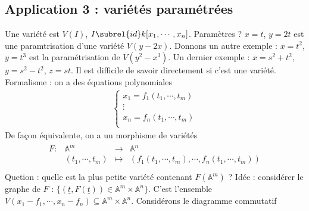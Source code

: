        \subsection{Application 3 : variétés paramétrées}
            Une variété est $V(I)$, $I \subrel{id} k[x_1, \cdots, x_n]$. Paramètres ? $x = t$, $y = 2t$ est une paramtrisation d'une variété $V(y - 2x)$. Donnons un autre exemple : $x = t^2$, $y = t^3$ est la paramétrisation de $V(y^2 - x^3)$. Un dernier exemple : $x = s^2 + t^2$, $y = s^2 - t^2$, $z = st$. Il est difficile de savoir directement si c'est une variété. Formalisme : on a des équations polynomiales 
            \begin{align*}
                \begin{cases}
                    x_1 = f_1(t_1, \cdots, t_m) \\
                    \vdots \\
                    x_n = f_n(t_1, \cdots, t_m) \\
                \end{cases}
            \end{align*}
            De façon équivalente, on a un morphisme de variétés
            \begin{align*}
                \begin{array}{cccc}
                    F : & \mathbb{A}^m & \to & \mathbb{A}^n \\
                    & (t_1, \cdots, t_m) & \mapsto & (f_1(t_1, \cdots, t_m), \cdots, f_n(t_1, \cdots, t_m)) \\
                \end{array}
            \end{align*}
            Quetion : quelle est la plus petite variété contenant $F(\mathbb{A}^m)$ ? Idée : considérer le graphe de $F$ : $\{(\underline{t}, F(\underline{t})) \in \mathbb{A}^m \times \mathbb{A}^n\}$. C'est l'ensemble $V(x_1 - f_1, \cdots, x_n - f_n) \subseteq \mathbb{A}^m \times \mathbb{A}^n$. Considérons le diagramme commutatif
            \begin{figure}[H]
                \centering
            \end{figure}

